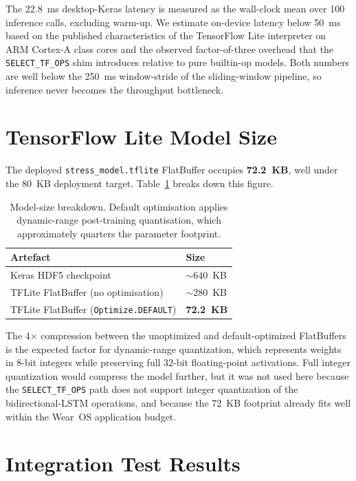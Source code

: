 The 22.8~ms desktop-Keras latency is measured as the wall-clock
mean over 100 inference calls, excluding warm-up. We estimate
on-device latency below 50~ms based on the published characteristics
of the TensorFlow Lite interpreter on ARM Cortex-A class cores and
the observed factor-of-three overhead that the \texttt{SELECT\_TF\_OPS}
shim introduces relative to pure builtin-op models. Both numbers are
well below the 250~ms window-stride of the sliding-window pipeline,
so inference never becomes the throughput bottleneck.

\section{TensorFlow Lite Model Size}
\label{sec:r-size}

The deployed \texttt{stress\_model.tflite} FlatBuffer occupies
\textbf{72.2~KB}, well under the 80~KB deployment target.
Table~\ref{tab:size-compare} breaks down this figure.

\begin{table}[H]
\centering
\caption{Model-size breakdown. Default optimisation applies
dynamic-range post-training quantisation, which approximately
quarters the parameter footprint.}
\label{tab:size-compare}
\small
\begin{tabular}{ll}
\toprule
\textbf{Artefact} & \textbf{Size} \\
\midrule
Keras HDF5 checkpoint                        & $\sim 640$~KB \\
TFLite FlatBuffer (no optimisation)          & $\sim 280$~KB \\
TFLite FlatBuffer (\texttt{Optimize.DEFAULT}) & \textbf{72.2~KB} \\
\bottomrule
\end{tabular}
\end{table}

The 4$\times$ compression between the unoptimized and default-optimized
FlatBuffers is the expected factor for dynamic-range quantization,
which represents weights in 8-bit integers while preserving full
32-bit floating-point activations. Full integer quantization would
compress the model further, but it was not used here because the
\texttt{SELECT\_TF\_OPS} path does not support integer quantization
of the bidirectional-LSTM operations, and because the 72~KB footprint
already fits well within the Wear~OS application budget.

\section{Integration Test Results}
\label{sec:r-integration}

